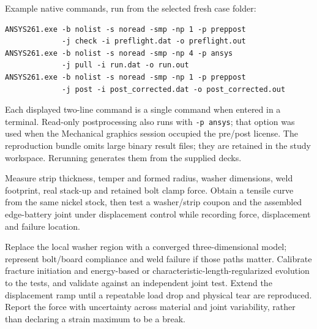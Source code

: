 \documentclass[10pt,a4paper]{article}
\newcommand{\ReportHeading}[1]{\par\vspace{7pt}{\large\bfseries\color{Teal}#1}\par\vspace{3pt}}
\begin{document}
Example native commands, run from the selected fresh case folder:
{\footnotesize\begin{verbatim}
ANSYS261.exe -b nolist -s noread -smp -np 1 -p preppost
             -j check -i preflight.dat -o preflight.out
ANSYS261.exe -b nolist -s noread -smp -np 4 -p ansys
             -j pull -i run.dat -o run.out
ANSYS261.exe -b nolist -s noread -smp -np 1 -p preppost
             -j post -i post_corrected.dat -o post_corrected.out
\end{verbatim}}
Each displayed two-line command is a single command when entered in a terminal. Read-only postprocessing also runs with \texttt{-p ansys}; that option was used when the Mechanical graphics session occupied the pre/post license. The reproduction bundle omits large binary result files; they are retained in the study workspace. Rerunning generates them from the supplied decks.

\ReportHeading{To obtain an actual snapping load}
Measure strip thickness, temper and formed radius, washer dimensions, weld footprint, real stack-up and retained bolt clamp force. Obtain a tensile curve from the same nickel stock, then test a washer/strip coupon and the assembled edge-battery joint under displacement control while recording force, displacement and failure location.

Replace the local washer region with a converged three-dimensional model; represent bolt/board compliance and weld failure if those paths matter. Calibrate fracture initiation and energy-based or characteristic-length-regularized evolution to the tests, and validate against an independent joint test. Extend the displacement ramp until a repeatable load drop and physical tear are reproduced. Report the force with uncertainty across material and joint variability, rather than declaring a strain maximum to be a break.
\end{document}
